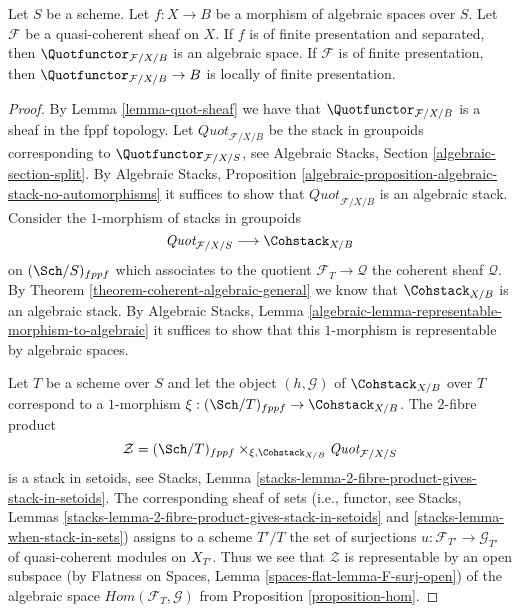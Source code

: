 \begin{proposition}
\label{proposition-quot}
Let $S$ be a scheme. Let $f : X \to B$ be a morphism of algebraic
spaces over $S$. Let $\mathcal{F}$ be a quasi-coherent sheaf
on $X$. If $f$ is of finite presentation and separated, then
$\Quotfunctor_{\mathcal{F}/X/B}$
is an algebraic space. If $\mathcal{F}$ is of finite presentation,
then $\Quotfunctor_{\mathcal{F}/X/B} \to B$ is locally of finite presentation.
\end{proposition}

\begin{proof}
By Lemma \ref{lemma-quot-sheaf}
we have that $\Quotfunctor_{\mathcal{F}/X/B}$ is a sheaf in the
fppf topology. Let $\textit{Quot}_{\mathcal{F}/X/B}$ be the stack in
groupoids corresponding to $\Quotfunctor_{\mathcal{F}/X/S}$, see
Algebraic Stacks, Section \ref{algebraic-section-split}.
By Algebraic Stacks, Proposition
\ref{algebraic-proposition-algebraic-stack-no-automorphisms}
it suffices to show that $\textit{Quot}_{\mathcal{F}/X/B}$
is an algebraic stack.
Consider the $1$-morphism of stacks in groupoids
$$
\textit{Quot}_{\mathcal{F}/X/S}
\longrightarrow
\Cohstack_{X/B}
$$
on $(\Sch/S)_{fppf}$ which associates to the quotient
$\mathcal{F}_T \to \mathcal{Q}$ the coherent sheaf $\mathcal{Q}$.
By Theorem \ref{theorem-coherent-algebraic-general} we know that
$\Cohstack_{X/B}$ is an algebraic stack.
By Algebraic Stacks, Lemma
\ref{algebraic-lemma-representable-morphism-to-algebraic}
it suffices to show that this $1$-morphism is representable
by algebraic spaces.

\medskip\noindent
Let $T$ be a scheme over $S$ and let the object $(h, \mathcal{G})$ of
$\Cohstack_{X/B}$ over $T$ correspond
to a $1$-morphism $\xi : (\Sch/T)_{fppf} \to \Cohstack_{X/B}$.
The $2$-fibre product
$$
\mathcal{Z} =
(\Sch/T)_{fppf}
\times_{\xi, \Cohstack_{X/B}}
\textit{Quot}_{\mathcal{F}/X/S}
$$
is a stack in setoids, see
Stacks, Lemma \ref{stacks-lemma-2-fibre-product-gives-stack-in-setoids}.
The corresponding sheaf of sets (i.e., functor, see
Stacks, Lemmas
\ref{stacks-lemma-2-fibre-product-gives-stack-in-setoids} and
\ref{stacks-lemma-when-stack-in-sets}) assigns to a scheme
$T'/T$ the set of surjections $u : \mathcal{F}_{T'} \to \mathcal{G}_{T'}$
of quasi-coherent modules on $X_{T'}$. Thus we see that
$\mathcal{Z}$ is representable by an open subspace
(by Flatness on Spaces, Lemma \ref{spaces-flat-lemma-F-surj-open})
of the algebraic space
$\mathit{Hom}(\mathcal{F}_T, \mathcal{G})$ from
Proposition \ref{proposition-hom}.
\end{proof}

